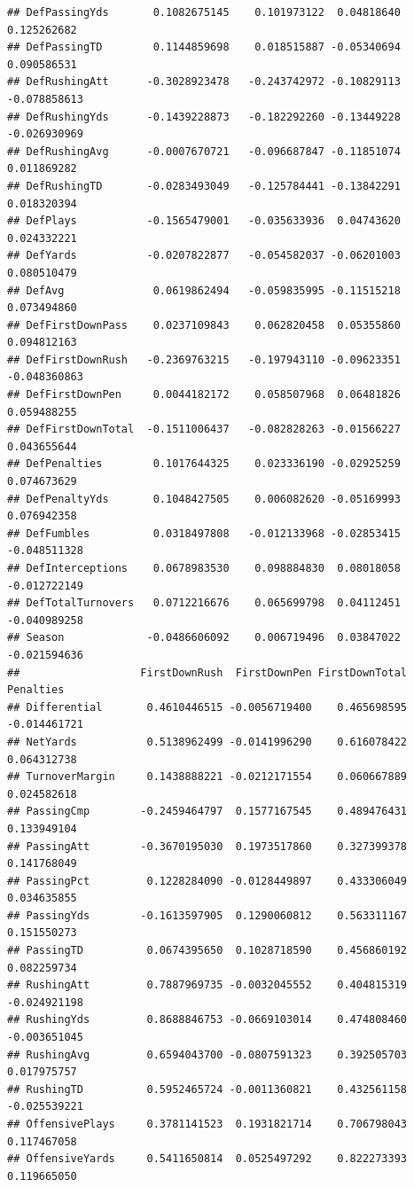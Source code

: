 \documentclass[
]{book}
\begin{document}
\begin{verbatim}
## DefPassingYds       0.1082675145    0.101973122  0.04818640   0.125262682
## DefPassingTD        0.1144859698    0.018515887 -0.05340694   0.090586531
## DefRushingAtt      -0.3028923478   -0.243742972 -0.10829113  -0.078858613
## DefRushingYds      -0.1439228873   -0.182292260 -0.13449228  -0.026930969
## DefRushingAvg      -0.0007670721   -0.096687847 -0.11851074   0.011869282
## DefRushingTD       -0.0283493049   -0.125784441 -0.13842291   0.018320394
## DefPlays           -0.1565479001   -0.035633936  0.04743620   0.024332221
## DefYards           -0.0207822877   -0.054582037 -0.06201003   0.080510479
## DefAvg              0.0619862494   -0.059835995 -0.11515218   0.073494860
## DefFirstDownPass    0.0237109843    0.062820458  0.05355860   0.094812163
## DefFirstDownRush   -0.2369763215   -0.197943110 -0.09623351  -0.048360863
## DefFirstDownPen     0.0044182172    0.058507968  0.06481826   0.059488255
## DefFirstDownTotal  -0.1511006437   -0.082828263 -0.01566227   0.043655644
## DefPenalties        0.1017644325    0.023336190 -0.02925259   0.074673629
## DefPenaltyYds       0.1048427505    0.006082620 -0.05169993   0.076942358
## DefFumbles          0.0318497808   -0.012133968 -0.02853415  -0.048511328
## DefInterceptions    0.0678983530    0.098884830  0.08018058  -0.012722149
## DefTotalTurnovers   0.0712216676    0.065699798  0.04112451  -0.040989258
## Season             -0.0486606092    0.006719496  0.03847022  -0.021594636
##                   FirstDownRush  FirstDownPen FirstDownTotal    Penalties
## Differential       0.4610446515 -0.0056719400    0.465698595 -0.014461721
## NetYards           0.5138962499 -0.0141996290    0.616078422  0.064312738
## TurnoverMargin     0.1438888221 -0.0212171554    0.060667889  0.024582618
## PassingCmp        -0.2459464797  0.1577167545    0.489476431  0.133949104
## PassingAtt        -0.3670195030  0.1973517860    0.327399378  0.141768049
## PassingPct         0.1228284090 -0.0128449897    0.433306049  0.034635855
## PassingYds        -0.1613597905  0.1290060812    0.563311167  0.151550273
## PassingTD          0.0674395650  0.1028718590    0.456860192  0.082259734
## RushingAtt         0.7887969735 -0.0032045552    0.404815319 -0.024921198
## RushingYds         0.8688846753 -0.0669103014    0.474808460 -0.003651045
## RushingAvg         0.6594043700 -0.0807591323    0.392505703  0.017975757
## RushingTD          0.5952465724 -0.0011360821    0.432561158 -0.025539221
## OffensivePlays     0.3781141523  0.1931821714    0.706798043  0.117467058
## OffensiveYards     0.5411650814  0.0525497292    0.822273393  0.119665050

\end{verbatim}
\end{document}
